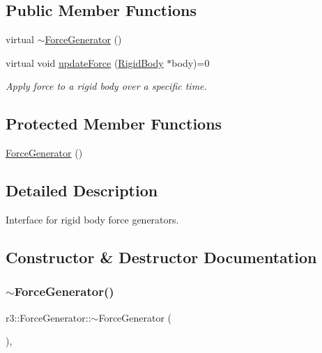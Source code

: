 \subsection*{Public Member Functions}
\begin{DoxyCompactItemize}
\item 
virtual \mbox{\hyperlink{classr3_1_1_force_generator_a64f1659bd0cf863ea28cccc689b2be3e}{$\sim$\+Force\+Generator}} ()
\item 
virtual void \mbox{\hyperlink{classr3_1_1_force_generator_a59deb54721cdcc6e33fabfb1f9a3fb27}{update\+Force}} (\mbox{\hyperlink{classr3_1_1_rigid_body}{Rigid\+Body}} $\ast$body)=0
\begin{DoxyCompactList}\small\item\em Apply force to a rigid body over a specific time. \end{DoxyCompactList}\end{DoxyCompactItemize}
\subsection*{Protected Member Functions}
\begin{DoxyCompactItemize}
\item 
\mbox{\hyperlink{classr3_1_1_force_generator_a7b21e48ccca59631975e0621057a1035}{Force\+Generator}} ()
\end{DoxyCompactItemize}


\subsection{Detailed Description}
Interface for rigid body force generators. 

\subsection{Constructor \& Destructor Documentation}
\mbox{\label{classr3_1_1_force_generator_a64f1659bd0cf863ea28cccc689b2be3e}} 
\subsubsection{\texorpdfstring{$\sim$\+Force\+Generator()}{~ForceGenerator()}}
{\footnotesize\ttfamily r3\+::\+Force\+Generator\+::$\sim$\+Force\+Generator (\begin{DoxyParamCaption}{ }\end{DoxyParamCaption})\hspace{0.3cm}{\ttfamily [virtual]}, {\ttfamily [default]}}

